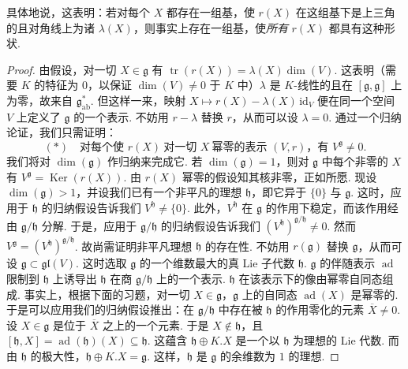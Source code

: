 \begin{numpara}[表示论刻画]
\begin{remark*}
具体地说，这表明：若对每个 $X$ 都存在一组基，使 $r(X)$ 在这组基下是上三角的且对角线上为诸 $\lambda(X)$，则事实上存在一组基，使\emph{所有} $r(X)$ 都具有这种形状.
\end{remark*}
\begin{proof}
由假设，对一切 $X\in\mathfrak g$ 有 $\operatorname{tr}(r(X))=\lambda(X)\dim(V)$. 这表明（需要 $K$ 的特征为 $0$，以保证 $\dim(V)\neq 0$ 于 $K$ 中）$\lambda$ 是 $K$-线性的且在 $[\mathfrak g,\mathfrak g]$ 上为零，故来自 $\mathfrak g_{\mathrm{ab}}^{*}$. 但这样一来，映射 $X\mapsto r(X)-\lambda(X)\,\mathrm{id}_{V}$ 便在同一个空间 $V$ 上定义了 $\mathfrak g$ 的一个表示. 不妨用 $r-\lambda$ 替换 $r$，从而可以设 $\lambda=0$. 通过一个归纳论证，我们只需证明：
\[
(\ast)\quad\text{对每个使 }r(X)\ \text{对一切 }X\ \text{幂零的表示 }(V,r)\text{，有 }V^{\mathfrak g}\neq 0.
\]
我们将对 $\dim(\mathfrak g)$ 作归纳来完成它. 若 $\dim(\mathfrak g)=1$，则对 $\mathfrak g$ 中每个非零的 $X$ 有 $V^{\mathfrak g}=\operatorname{Ker}(r(X))$. 由 $r(X)$ 幂零的假设知其核非零，正如所愿. 现设 $\dim(\mathfrak g)>1$，并设我们已有一个非平凡的理想 $\mathfrak h$，即它异于 $\{0\}$ 与 $\mathfrak g$. 这时，应用于 $\mathfrak h$ 的归纳假设告诉我们 $V^{\mathfrak h}\neq\{0\}$. 此外，$V^{\mathfrak h}$ 在 $\mathfrak g$ 的作用下稳定，而该作用经由 $\mathfrak g/\mathfrak h$ 分解. 于是，应用于 $\mathfrak g/\mathfrak h$ 的归纳假设告诉我们 $(V^{\mathfrak h})^{\mathfrak g/\mathfrak h}\neq 0$. 然而 $V^{\mathfrak g}=(V^{\mathfrak h})^{\mathfrak g/\mathfrak h}$.
故尚需证明非平凡理想 $\mathfrak h$ 的存在性. 不妨用 $r(\mathfrak g)$ 替换 $\mathfrak g$，从而可设 $\mathfrak g\subset\mathfrak{gl}(V)$. 这时选取 $\mathfrak g$ 的一个维数最大的真 Lie 子代数 $\mathfrak h$. $\mathfrak g$ 的伴随表示 $\operatorname{ad}$ 限制到 $\mathfrak h$ 上诱导出 $\mathfrak h$ 在商 $\mathfrak g/\mathfrak h$ 上的一个表示. $\mathfrak h$ 在该表示下的像由幂零自同态组成. 事实上，根据下面的习题，对一切 $X\in\mathfrak g$，$\mathfrak g$ 上的自同态 $\operatorname{ad}(X)$ 是幂零的. 于是可以应用我们的归纳假设推出：在 $\mathfrak g/\mathfrak h$ 中存在被 $\mathfrak h$ 的作用零化的元素 $\overline{X}\neq 0$. 设 $X\in\mathfrak g$ 是位于 $\overline{X}$ 之上的一个元素. 于是 $X\notin\mathfrak h$，且 $[\mathfrak h,X]=\operatorname{ad}(\mathfrak h)(X)\subseteq\mathfrak h$. 这蕴含 $\mathfrak h\oplus K.X$ 是一个以 $\mathfrak h$ 为理想的 Lie 代数. 而由 $\mathfrak h$ 的极大性，$\mathfrak h\oplus K.X=\mathfrak g$. 这样，$\mathfrak h$ 是 $\mathfrak g$ 的余维数为 $1$ 的理想.
\end{proof}
\begin{exercise*}

\end{exercise*}
\end{numpara}
